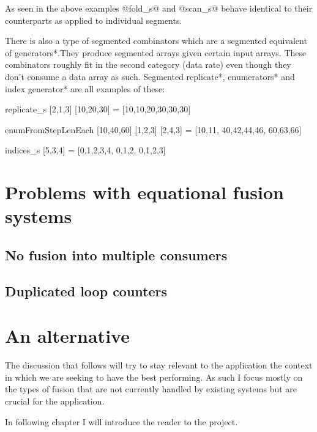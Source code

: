 \documentclass[preamble.tex]{subfiles}
\begin{document}
As seen in the above examples @fold_s@ and @scan_s@ behave identical to their  counterparts as applied to individual segments.

There is also a type of segmented combinators which are a segmented equivalent of \*generators*.\igencomb They produce segmented arrays given certain input arrays. These combinators roughly fit in the second category (data rate) even though they don't consume a data array as such. \*Segmented replicate*, \*enumerators* and \*index generator* are all examples of these:

\begin{hscode}
replicate_s [2,1,3] [10,20,30] = [10,10,20,30,30,30]

enumFromStepLenEach [10,40,60] [1,2,3] [2,4,3]
  = [10,11, 40,42,44,46, 60,63,66]

indices_s [5,3,4] = [0,1,2,3,4, 0,1,2, 0,1,2,3]
\end{hscode}


\clearpage
\section{Problems with equational fusion systems}

\subsection{No fusion into multiple consumers}

\subsection{Duplicated loop counters}

\clearpage
\section{An alternative}

The discussion that follows will try to stay relevant to the application the context in which we are seeking to have the best performing. As such I focus mostly on the types of fusion that are not currently handled by existing systems but are crucial for the application.


In following chapter I will introduce the reader to the \DPH project.


\IfNotCompilingAll{}
\end{document}
